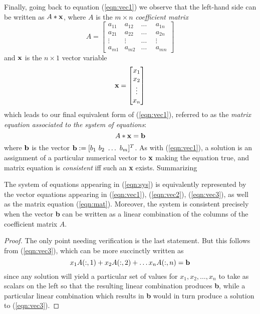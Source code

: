 \documentclass{ximera}
\begin{document}
Finally, going back to equation (\ref{eqn:vec1}) we observe that the left-hand side can be written as $A*{\bf x}$, where $A$ is the $m\times n$ {\it coefficient matrix}
\begin{equation}
\label{eqn:coeff}
A = \begin{bmatrix}
a_{11}  &a_{12} &{}\ldots{} &a_{1n}\\ 
a_{21} &a_{22} &{}\ldots{} & a_{2n}\\
\vdots\ \  &  \vdots\ \  &  {}\ldots{}\ \  &  \vdots\\
a_{m1} &a_{m2} &{}\ldots{} &a_{mn} 
\end{bmatrix}
\end{equation}
and ${\bf x}$ is the $n\times 1$ vector variable
\[
{\bf x} = \begin{bmatrix}
x_1\\ 
x_2\\
\vdots\\
x_n 
\end{bmatrix}
\]
which leads to our final equivalent form of (\ref{eqn:vec1}), referred to as the {\it matrix equation associated to the system of equations}:
\begin{equation}\label{eqn:mat}
A*{\bf x} = {\bf b}
\end{equation}
where ${\bf b}$ is the vector ${\bf b} := [b_1\  b_2\ \dots\  b_m]^T$. As with (\ref{eqn:vec1}), a solution is an assignment of a particular numerical vector to $\bf x$ making the equation true, and matrix equation is {\it consistent} iff such an {\bf x} exists. Summarizing

\begin{theorem} The system of equations appearing in (\ref{eqn:sys}) is equivalently represented by the vector equations appearing in (\ref{eqn:vec1}), (\ref{eqn:vec2}), (\ref{eqn:vec3}), as well as the matrix equation (\ref{eqn:mat}). Moreover, the system is consistent precisely when the vector {\bf b} can be written as a linear combination of the columns of the coefficient matrix $A$. 
\end{theorem}

\begin{proof} The only point needing verification is the last statement. But this follows from (\ref{eqn:vec3}), which can be more succinctly written as
\[
x_1 A(:,1) + x_2 A(:,2) +\dots x_n A(:,n) = {\bf b}
\]
 since any solution will yield a particular set of values for $x_1,x_2,\dots,x_n$ to take as scalars on the left so that the resulting linear combination produces {\bf b}, while a particular linear combination which results in {\bf b} would in turn produce a solution to (\ref{eqn:vec3}).
\end{proof}
\end{document}
